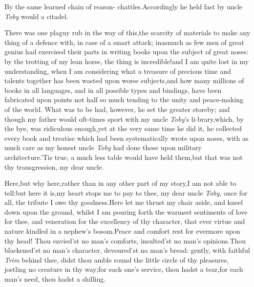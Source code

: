 \documentclass{article}
\begin{document}
By the same learned chain of reason- 
chattles.\sic\tsk Accordingly he held fast by
uncle \textit{Toby} would a citadel.

There was one plaguy rub in the way of this,\tsh the
scarcity of materials to make any thing of a defence with, in
case
of a smart attack; inasmuch as few men of great genius had
exercised their parts in writing books upon the subject of\break 
great noses: by the trotting of my lean horse, the thing is
incredible!\@  and I am quite lost in my understanding, when I am
considering what a treasure of precious time and talents
together has been wasted upon worse subjects,\tsk and how many
millions of books in all languages, and in all possible types and
bindings, have been fabricated upon points not half so much
tending to the unity and peace-making of the world.  What was to
be had, however, he set the greater store\break by; and though my
father would oft-times sport with my uncle \textit{Toby}’s
li-\break brary,\tsk which, by the bye, was ridiculous enough,\tsk yet
at the very same time he did it, he collected every book
and treatise which had been systematically wrote upon
noses, with as much care as my honest uncle \textit{Toby} had done
those upon military architecture.\tsh ’Tis true, a
much less table would have held them,\tsk but that was not thy
transgression, my dear uncle.\tsh

Here,\tsh but why here,\tsh rather than in any
other part of my story,\tsh I am not able to
tell:\tsh but here it is,\tsh my heart stops me to
pay to\break
thee, my dear uncle \textit{Toby}, once for all, the tribute I
owe thy goodness.\tsh Here\break
let me thrust my chair aside, and kneel\break
down upon the ground, whilst I am\break
pouring forth the warmest sentiments\break
of love for thee, and veneration for\break
the excellency of thy character, that\break
ever virtue and nature kindled in a
nephew’s bosom.\tsh Peace and comfort rest for evermore upon thy
head!\tsk\break
Thou envied’st no man’s comforts,\tsh\break
insulted’st no man’s opinions.\tsh Thou\break
blackened’st no man’s character,\tsh\break
devoured’st no man’s bread: gently,\break
with faithful \textit{Trim} behind thee, didst\break
thou amble round the little circle of\break
thy pleasures, jostling no creature in\break
thy way;\tsk for each one’s service,\break
thou hadst a tear,\tsk for each man’s\break
need, thou hadst a shilling.
\end{document}
